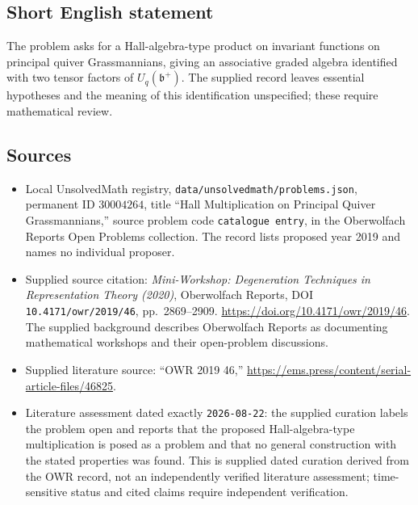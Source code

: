 \documentclass[11pt]{article}
\begin{document}
\subsection{Short English statement}
The problem asks for a Hall-algebra-type product on invariant functions on principal quiver Grassmannians, giving an associative graded algebra identified with two tensor factors of \(U_q(\mathfrak b^+)\). The supplied record leaves essential hypotheses and the meaning of this identification unspecified; these require mathematical review.
\subsection{Sources}
\begin{itemize}
\item Local UnsolvedMath registry, \texttt{data/unsolvedmath/problems.json}, permanent ID \(30004264\), title ``Hall Multiplication on Principal Quiver Grassmannians,'' source problem code \texttt{catalogue entry}, in the Oberwolfach Reports Open Problems collection. The record lists proposed year 2019 and names no individual proposer.
\item Supplied source citation: \emph{Mini-Workshop: Degeneration Techniques in Representation Theory (2020)}, Oberwolfach Reports, DOI \texttt{10.4171/owr/2019/46}, pp.\ 2869--2909. \url{https://doi.org/10.4171/owr/2019/46}. The supplied background describes Oberwolfach Reports as documenting mathematical workshops and their open-problem discussions.
\item Supplied literature source: ``OWR 2019 46,'' \url{https://ems.press/content/serial-article-files/46825}.
\item Literature assessment dated exactly \texttt{2026-08-22}: the supplied curation labels the problem open and reports that the proposed Hall-algebra-type multiplication is posed as a problem and that no general construction with the stated properties was found. This is supplied dated curation derived from the OWR record, not an independently verified literature assessment; time-sensitive status and cited claims require independent verification.
\end{itemize}
\end{document}
